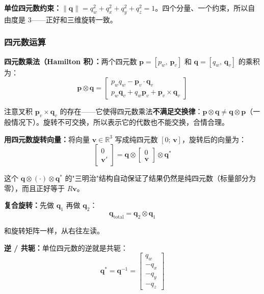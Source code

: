\textbf{单位四元数约束：}$\|\mathbf{q}\| = q_w^2 + q_x^2 + q_y^2 + q_z^2 = 1$。四个分量、一个约束，所以自由度是 3——正好和三维旋转一致。

\subsubsection{四元数运算}

\textbf{四元数乘法（Hamilton 积）：}两个四元数 $\mathbf{p} = [p_w,\, \mathbf{p}_v]$ 和 $\mathbf{q} = [q_w,\, \mathbf{q}_v]$ 的乘积为：
\begin{equation}
\mathbf{p} \otimes \mathbf{q} = \begin{bmatrix} p_w q_w - \mathbf{p}_v \cdot \mathbf{q}_v \\ p_w \mathbf{q}_v + q_w \mathbf{p}_v + \mathbf{p}_v \times \mathbf{q}_v \end{bmatrix}
\end{equation}

注意叉积 $\mathbf{p}_v \times \mathbf{q}_v$ 的存在——它使得四元数乘法\textbf{不满足交换律}：$\mathbf{p} \otimes \mathbf{q} \neq \mathbf{q} \otimes \mathbf{p}$（一般情况下）。旋转不可交换，所以表示它的代数也不能交换，合情合理。

\textbf{用四元数旋转向量：}将向量 $\mathbf{v} \in \mathbb{R}^3$ 写成纯四元数 $[0;\, \mathbf{v}]$，旋转后的向量为：
\begin{equation}
\begin{bmatrix} 0 \\ \mathbf{v}' \end{bmatrix} = \mathbf{q} \otimes \begin{bmatrix} 0 \\ \mathbf{v} \end{bmatrix} \otimes \mathbf{q}^*
\end{equation}

这个 $\mathbf{q} \otimes (\cdot) \otimes \mathbf{q}^*$ 的"三明治"结构自动保证了结果仍然是纯四元数（标量部分为零），而且正好等于 $R\mathbf{v}$。

\textbf{复合旋转：}先做 $\mathbf{q}_1$ 再做 $\mathbf{q}_2$：
\begin{equation}
\mathbf{q}_{\text{total}} = \mathbf{q}_2 \otimes \mathbf{q}_1
\end{equation}

和旋转矩阵一样，从右往左读。

\textbf{逆 / 共轭：}单位四元数的逆就是共轭：
\begin{equation}
\mathbf{q}^* = \mathbf{q}^{-1} = \begin{bmatrix} q_w \\ -q_x \\ -q_y \\ -q_z \end{bmatrix}
\end{equation}

